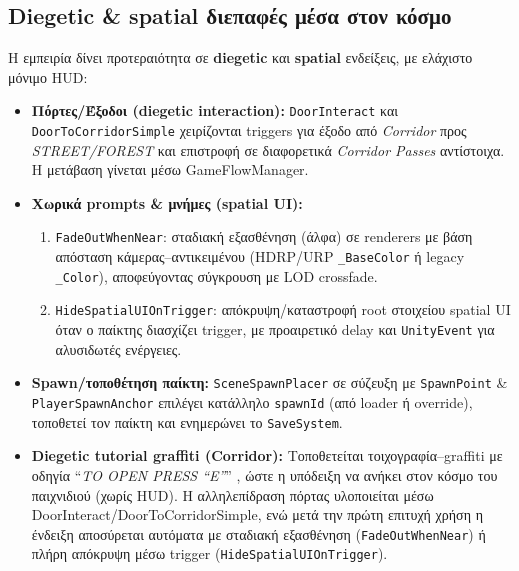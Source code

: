 \subsection{Diegetic \& spatial διεπαφές μέσα στον κόσμο}
Η εμπειρία δίνει προτεραιότητα σε \textbf{diegetic} και \textbf{spatial} ενδείξεις, με ελάχιστο μόνιμο HUD:
\begin{itemize}
  \item \textbf{Πόρτες/Έξοδοι (diegetic interaction):} \texttt{DoorInteract} και \texttt{DoorToCorridorSimple} χειρίζονται triggers για έξοδο από \emph{Corridor} προς \emph{STREET/FOREST} και επιστροφή σε διαφορετικά \emph{Corridor Passes} αντίστοιχα. Η μετάβαση γίνεται μέσω GameFlowManager.
  \item \textbf{Χωρικά prompts \& μνήμες (spatial UI):} 
  \begin{enumerate}
    \item \texttt{FadeOutWhenNear}: σταδιακή εξασθένηση (άλφα) σε renderers με βάση απόσταση κάμερας–αντικειμένου (HDRP/URP \texttt{\_BaseColor} ή legacy \texttt{\_Color}), αποφεύγοντας σύγκρουση με LOD crossfade.
    \item \texttt{HideSpatialUIOnTrigger}: απόκρυψη/καταστροφή root στοιχείου spatial UI όταν ο παίκτης διασχίζει trigger, με προαιρετικό delay και \texttt{UnityEvent} για αλυσιδωτές ενέργειες.
  \end{enumerate}
  \item \textbf{Spawn/τοποθέτηση παίκτη:} \texttt{SceneSpawnPlacer} σε σύζευξη με \texttt{SpawnPoint} \& \texttt{PlayerSpawnAnchor} επιλέγει κατάλληλο \texttt{spawnId} (από loader ή override), τοποθετεί τον παίκτη και ενημερώνει το \texttt{SaveSystem}. 
  \item \textbf{Diegetic tutorial graffiti (Corridor):} Τοποθετείται τοιχογραφία--graffiti με οδηγία ``\textit{TO OPEN PRESS ``E''}'' , ώστε η υπόδειξη να ανήκει στον κόσμο του παιχνιδιού (χωρίς HUD).
Η αλληλεπίδραση πόρτας υλοποιείται μέσω {\ttfamily DoorInteract/\allowbreak DoorToCorridorSimple}, ενώ μετά την πρώτη επιτυχή χρήση η ένδειξη αποσύρεται αυτόματα με σταδιακή εξασθένηση (\texttt{FadeOutWhenNear}) ή πλήρη απόκρυψη μέσω trigger (\texttt{HideSpatialUIOnTrigger}). 
\end{itemize}

